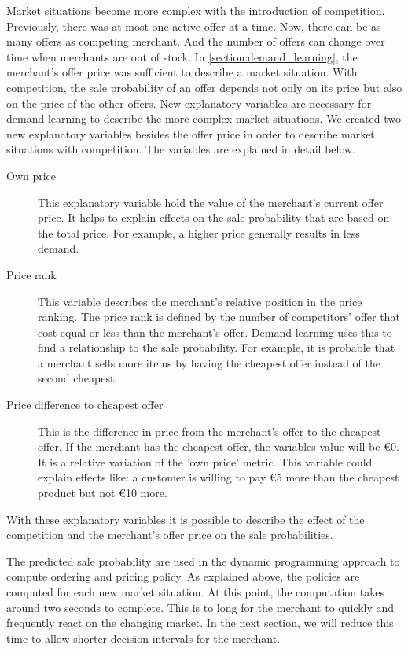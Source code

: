 Market situations become more complex with the introduction of competition.
Previously, there was at most one active offer at a time.
Now, there can be as many offers as competing merchant.
And the number of offers can change over time when merchants are out of stock.
In \cref{section:demand_learning}, the merchant's offer price was sufficient to describe a market situation.
With competition, the sale probability of an offer depends not only on its price but also on the price of the other offers.
New explanatory variables are necessary for demand learning to describe the more complex market situations.
We created two new explanatory variables besides the offer price in order to describe market situations with competition.
The variables are explained in detail below.

\begin{description}
	\item [Own price]
		This explanatory variable hold the value of the merchant's current offer price.
		It helps to explain effects on the sale probability that are based on the total price.
		For example, a higher price generally results in less demand.
	\item [Price rank]
		This variable describes the merchant's relative position in the price ranking.
		The price rank is defined by the number of competitors' offer that cost equal or less than the merchant's offer.
		Demand learning uses this to find a relationship to the sale probability.
		For example, it is probable that a merchant sells more items by having the cheapest offer instead of the second cheapest.
	\item [Price difference to cheapest offer]
		This is the difference in price from the merchant's offer to the cheapest offer.
		If the merchant has the cheapest offer, the variables value will be €0.
		It is a relative variation of the 'own price' metric.
		This variable could explain effects like: a customer is willing to pay €5 more than the cheapest product but not €10 more.
\end{description}

With these explanatory variables it is possible to describe the effect of the competition and the merchant's offer price on the sale probabilities.

The predicted sale probability are used in the dynamic programming approach to compute ordering and pricing policy.
As explained above, the policies are computed for each new market situation.
At this point, the computation takes around two seconds to complete.
This is to long for the merchant to quickly and frequently react on the changing market.
In the next section, we will reduce this time to allow shorter decision intervals for the merchant.

